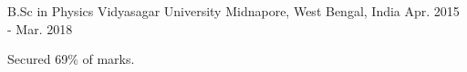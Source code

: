 

\begin{cventries}

  \cventry
    {B.Sc in Physics} %
    {Vidyasagar University} %
    {Midnapore, West Bengal, India} %
    {Apr. 2015 - Mar. 2018} %
    {
      \begin{cvitems} %
        \item {Secured 69\% of marks.}
      \end{cvitems}
    }
    
    \vspace{2mm} %
\end{cventries}
